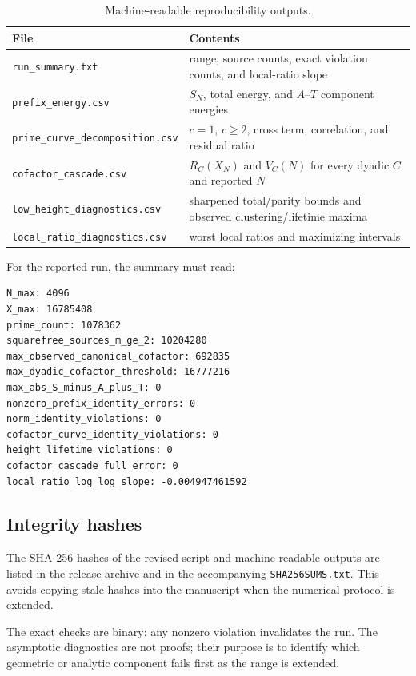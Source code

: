 \documentclass[11pt]{article}
\theoremstyle{definition}
\theoremstyle{remark}
\newcommand{\1}{\mathbf{1}}
\begin{document}
\begin{table}[htbp]
\centering
\caption{Machine-readable reproducibility outputs.}
\label{tab:repro-files}
\small
\begin{tabular}{lp{}}
\toprule
File & Contents\\
\midrule
\texttt{run\_summary.txt}
& range, source counts, exact violation counts, and local-ratio slope\\
\texttt{prefix\_energy.csv}
& $S_N$, total energy, and $A$--$T$ component energies\\
\texttt{prime\_curve\_decomposition.csv}
& $c=1$, $c\ge2$, cross term, correlation, and residual ratio\\
\texttt{cofactor\_cascade.csv}
& $R_C(X_N)$ and $V_C(N)$ for every dyadic $C$ and reported $N$\\
\texttt{low\_height\_diagnostics.csv}
& sharpened total/parity bounds and observed clustering/lifetime maxima\\
\texttt{local\_ratio\_diagnostics.csv}
& worst local ratios and maximizing intervals\\
\bottomrule
\end{tabular}
\end{table}

For the reported run, the summary must read:
\begin{verbatim}
N_max: 4096
X_max: 16785408
prime_count: 1078362
squarefree_sources_m_ge_2: 10204280
max_observed_canonical_cofactor: 692835
max_dyadic_cofactor_threshold: 16777216
max_abs_S_minus_A_plus_T: 0
nonzero_prefix_identity_errors: 0
norm_identity_violations: 0
cofactor_curve_identity_violations: 0
height_lifetime_violations: 0
cofactor_cascade_full_error: 0
local_ratio_log_log_slope: -0.004947461592
\end{verbatim}

\subsection{Integrity hashes}

The SHA-256 hashes of the revised script and machine-readable outputs
are listed in the release archive and in the accompanying
\texttt{SHA256SUMS.txt}.  This avoids copying stale hashes into the
manuscript when the numerical protocol is extended.

The exact checks are binary: any nonzero violation invalidates the run.
The asymptotic diagnostics are not proofs; their purpose is to identify
which geometric or analytic component fails first as the range is
extended.
\end{document}
